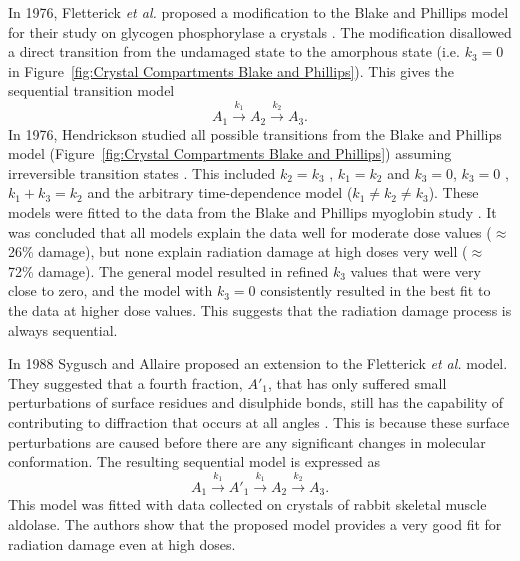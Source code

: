        In 1976, Fletterick \textit{et al.} proposed a modification to the Blake and Phillips model for their study on  glycogen phosphorylase a crystals \cite{fletterick1976low}.
        The modification disallowed a direct transition from the undamaged state to the amorphous state (i.e. $k_3 = 0$ in Figure~\ref{fig:Crystal Compartments Blake and Phillips}). This gives the sequential transition model
        \begin{equation}
            A_1 \xrightarrow{k_1} A_2 \xrightarrow{k_2} A_3.
        \end{equation}
        In 1976, Hendrickson studied all possible transitions from the Blake and Phillips model (Figure~\ref{fig:Crystal Compartments Blake and Phillips}) assuming irreversible transition states \cite{hendrickson1976}.
        This included $k_2 = k_3$ \cite{hendrickson1973}, $k_1 = k_2$ and $k_3 = 0$, $k_3 = 0$ \cite{fletterick1976low}, $k_1 + k_3 = k_2$ and the arbitrary time-dependence model ($k_1 \neq k_2 \neq k_3$).
        These models were fitted to the data from the Blake and Phillips myoglobin study \cite{blake1962}.
        It was concluded that all models explain the data well for moderate dose values ($\approx$ 26\% damage), but none explain radiation damage at high doses very well ($\approx$ 72\% damage).
        The general model resulted in refined $k_3$ values that were very close to zero, and the model with $k_3 = 0$ consistently resulted in the best fit to the data at higher dose values.
        This suggests that the radiation damage process is always sequential.

		In 1988 Sygusch and Allaire proposed an extension to the Fletterick \textit{et al.} model.
        They suggested that a fourth fraction, $A'_1$, that has only suffered small perturbations of surface residues and disulphide bonds, still has the capability of contributing to diffraction that occurs at all angles \cite{sygusch1988}.
        This is because these surface perturbations are caused before there are any significant changes in molecular conformation.
        The resulting sequential model is expressed as
        \begin{equation}
            A_1 \xrightarrow{k_1} A'_1 \xrightarrow{k_1} A_2 \xrightarrow{k_2} A_3.
        \end{equation}
        This model was fitted with data collected on crystals of rabbit skeletal muscle aldolase. The authors show that the proposed model provides a very good fit for radiation damage even at high doses.

